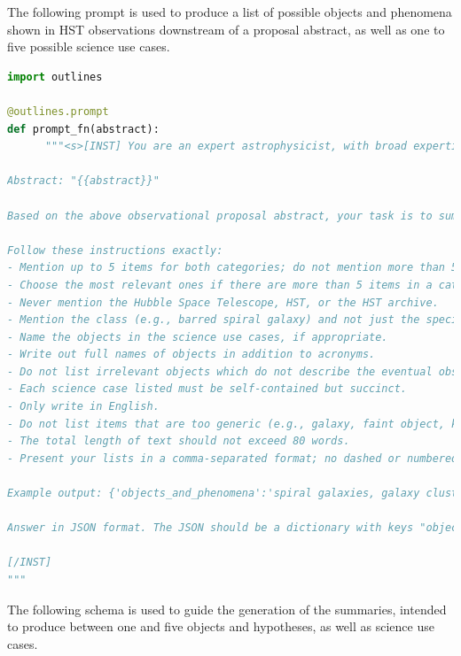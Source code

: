 \documentclass[10pt]{article} %
\begin{document}
The following prompt is used to produce a list of possible objects and phenomena shown in HST observations downstream of a proposal abstract, as well as one to five possible science use cases.

\begin{lstlisting}[language=Python]
import outlines 

@outlines.prompt
def prompt_fn(abstract):
      """<s>[INST] You are an expert astrophysicist, with broad expertise across observational and theoretical astrophysics. You are able to extract core information from astrophysical texts.

Abstract: "{{abstract}}"

Based on the above observational proposal abstract, your task is to summarize the nature of the eventual observations. You will identify the astrophysical objects and phenomena, as well as the potential science use cases described in the abstract.

Follow these instructions exactly:
- Mention up to 5 items for both categories; do not mention more than 5 items in either category. 
- Choose the most relevant ones if there are more than 5 items in a category.
- Never mention the Hubble Space Telescope, HST, or the HST archive.
- Mention the class (e.g., barred spiral galaxy) and not just the specific instance (e.g., Andromeda).
- Name the objects in the science use cases, if appropriate.
- Write out full names of objects in addition to acronyms.
- Do not list irrelevant objects which do not describe the eventual observation, such as units or proposal Cycle numbers. List fewer but more relevant objects, if in doubt.
- Each science case listed must be self-contained but succinct.
- Only write in English.
- Do not list items that are too generic (e.g., galaxy, faint object, kinematics)
- The total length of text should not exceed 80 words.
- Present your lists in a comma-separated format; no dashed or numbered lists.

Example output: {'objects_and_phenomena':'spiral galaxies, galaxy clusters, supernova remnants', 'science_use_cases':'model galactic structure and evolution, characterize dark matter distribution in clusters, analyze expansion rates of supernova remnants'}

Answer in JSON format. The JSON should be a dictionary with keys "objects_and_phenomena" and "science_use_cases".

[/INST]
"""
\end{lstlisting}

The following schema is used to guide the generation of the summaries, intended to produce between one and five objects and hypotheses, as well as science use cases.
\end{document}
